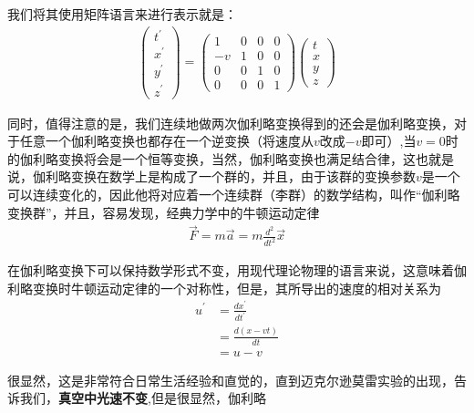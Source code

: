 \documentclass{article}
\begin{document}
我们将其使用矩阵语言来进行表示就是：
\begin{align*}
    \begin{pmatrix}
        t^\prime\\x^\prime\\y^\prime\\z^\prime
    \end{pmatrix}
    =
    \begin{pmatrix}
        1&0&0&0\\
        -v&1&0&0\\
        0&0&1&0\\
        0&0&0&1
    \end{pmatrix}
    \begin{pmatrix}
        t\\x\\y\\z
    \end{pmatrix}
\end{align*}

同时，值得注意的是，我们连续地做两次伽利略变换得到的还会是伽利略变换，对于任意一个伽利略变换也都存在一个逆变换（将速度从$v$改成$-v$即可）,当$v=0$时的伽利略变换将会是一个恒等变换，当然，伽利略变换也满足结合律，这也就是说，伽利略变换在数学上是构成了一个群的，并且，由于该群的变换参数$v$是一个可以连续变化的，因此他将对应着一个连续群（李群）的数学结构，叫作“伽利略变换群”，并且，容易发现，经典力学中的牛顿运动定律
\begin{align*}
    \vec{F}=m\vec{a}=m\frac{d^2}{dt^2}\vec{x}
\end{align*}

在伽利略变换下可以保持数学形式不变，用现代理论物理的语言来说，这意味着伽利略变换时牛顿运动定律的一个对称性，但是，其所导出的速度的相对关系为
\begin{align*}
    u^\prime&=\frac{d x^\prime}{dt^\prime}\\
    &=\frac{d(x-vt)}{dt}\\
    &=u-v
\end{align*}

很显然，这是非常符合日常生活经验和直觉的，直到迈克尔逊莫雷实验的出现，告诉我们，\textbf{真空中光速不变},但是很显然，伽利略
\end{document}
